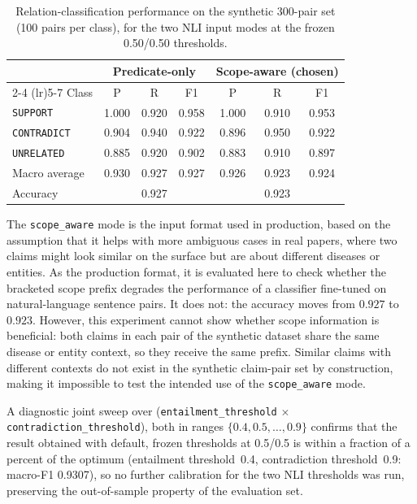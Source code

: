 \begin{itemize}[label={},leftmargin=1.5em]
    \begin{table}[htpb]
    \caption[Relation-classification performance per
    class]{Relation-classification performance on the synthetic 300-pair set (100 pairs per class), for the two NLI input modes at the frozen 0.50/0.50 thresholds.}
    \label{tab:results-relation-classification-detailed}
        \centering
        \begin{tabular}{l ccc ccc}
        \toprule
        & \multicolumn{3}{c}{Predicate-only} &
        \multicolumn{3}{c}{Scope-aware (chosen)} \\
        \cmidrule(lr){2-4} \cmidrule(lr){5-7}
        Class & P & R & F1 & P & R & F1 \\
        \midrule
        \texttt{SUPPORT}    & 1.000 & 0.920 & 0.958 & 1.000 & 0.910 & 0.953
        \\
        \texttt{CONTRADICT} & 0.904 & 0.940 & 0.922 & 0.896 & 0.950 & 0.922
        \\
        \texttt{UNRELATED}     & 0.885 & 0.920 & 0.902 & 0.883 & 0.910 & 0.897
        \\
        \midrule  
        Macro average & 0.930 & 0.927 & 0.927 & 0.926 & 0.923 & 0.924
        \\
        Accuracy      & \multicolumn{3}{c}{0.927} &
        \multicolumn{3}{c}{0.923} \\
        \bottomrule
    \end{tabular}
    \end{table}

    The \texttt{scope\_aware} mode is the input format used in production, based on the assumption that it helps with more ambiguous cases in real papers, where two claims might look similar on the surface but are about different diseases or entities. As the production format, it is evaluated here to check whether the bracketed scope prefix degrades the performance of a classifier fine-tuned on natural-language sentence pairs. It does not: the accuracy moves from $0.927$ to $0.923$. However, this experiment cannot show whether scope information is beneficial: both claims in each pair of the synthetic dataset share the same disease or entity context, so they receive the same prefix. Similar claims with different contexts do not exist in the synthetic claim-pair set by construction, making it impossible to test the intended use of the \texttt{scope\_aware} mode. 
    
    A diagnostic joint sweep over (\texttt{entailment\_threshold} $\times$ \texttt{contradiction\_threshold}), both in ranges $\{0.4, 0.5, \dots, 0.9\}$ confirms that the result obtained with default, frozen thresholds at 0.5/0.5 is within a fraction of a percent of the optimum (entailment threshold~0.4, contradiction threshold~0.9: macro-F1 0.9307), so no further calibration for the two NLI thresholds was run, preserving the out-of-sample property of the evaluation set.

\end{itemize}

